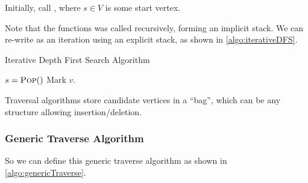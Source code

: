 Initially, call ,
where $s \in V$ is some start vertex.

Note that the functions was called recursively, forming an implicit stack.
We can re-write as an iteration using an explicit stack,
as shown in \cref{algo:iterativeDFS}.

\begin{algorithm}[H]
    \caption{Iterative Depth First Search Algorithm}\label{algo:iterativeDFS}
    \begin{algorithmic}[1]
            \State{}
                \State $s = \textsc{Pop} ()$
                    \State Mark $v$.
                            \State{}
                        \EndIf
                    \EndFor
                \EndIf
            \EndWhile
        \EndProcedure
    \end{algorithmic}
\end{algorithm}

\observation
Traversal algorithms store candidate vertices in a ``bag'',
which can be any structure allowing insertion/deletion.

\subsubsection{Generic Traverse Algorithm}

So we can define this generic traverse algorithm
as shown in \cref{algo:genericTraverse}.


